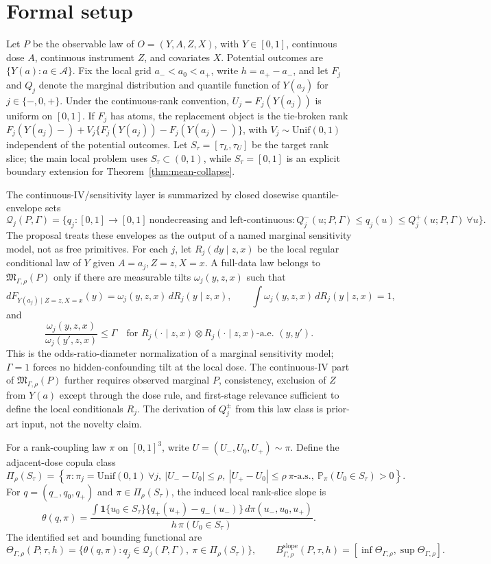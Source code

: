 \documentclass[11pt]{article}
\renewcommand{\Pr}{\mathbb{P}}
\newcommand{\one}{\mathbf{1}}
\theoremstyle{definition}
\theoremstyle{plain}
\theoremstyle{remark}
\begin{document}
\section{Formal setup}
Let \(P\) be the observable law of \(O=(Y,A,Z,X)\), with \(Y\in[0,1]\), continuous dose \(A\), continuous instrument \(Z\), and covariates \(X\).  Potential outcomes are \(\{Y(a):a\in\mathcal A\}\).  Fix the local grid \(a_-<a_0<a_+\), write \(h=a_+-a_-\), and let \(F_j\) and \(Q_j\) denote the marginal distribution and quantile function of \(Y(a_j)\) for \(j\in\{-,0,+\}\).  Under the continuous-rank convention, \(U_j=F_j(Y(a_j))\) is uniform on \([0,1]\).  If \(F_j\) has atoms, the replacement object is the tie-broken rank \(F_j(Y(a_j)-)+V_j\{F_j(Y(a_j))-F_j(Y(a_j)-)\}\), with \(V_j\sim\mathrm{Unif}(0,1)\) independent of the potential outcomes.  Let \(S_\tau=[\tau_L,\tau_U]\) be the target rank slice; the main local problem uses \(S_\tau\subset(0,1)\), while \(S_\tau=[0,1]\) is an explicit boundary extension for Theorem~\ref{thm:mean-collapse}.

The continuous-IV/sensitivity layer is summarized by closed dosewise quantile-envelope sets
\[
\mathcal Q_j(P,\Gamma)=
\{q_j:[0,1]\to[0,1]\ \text{nondecreasing and left-continuous}:
Q^-_j(u;P,\Gamma)\le q_j(u)\le Q^+_j(u;P,\Gamma)\ \forall u\}.
\]
The proposal treats these envelopes as the output of a named marginal sensitivity model, not as free primitives.  For each \(j\), let \(R_j(dy\mid z,x)\) be the local regular conditional law of \(Y\) given \(A=a_j,Z=z,X=x\).  A full-data law belongs to \(\mathfrak M_{\Gamma,\rho}(P)\) only if there are measurable tilts \(\omega_j(y,z,x)\) such that
\[
dF_{Y(a_j)\mid Z=z,X=x}(y)=\omega_j(y,z,x)\,dR_j(y\mid z,x),\qquad
\int\omega_j(y,z,x)\,dR_j(y\mid z,x)=1,
\]
and
\[
\frac{\omega_j(y,z,x)}{\omega_j(y',z,x)}\le\Gamma
\quad\text{for }R_j(\cdot\mid z,x)\otimes R_j(\cdot\mid z,x)\text{-a.e. }(y,y').
\]
This is the odds-ratio-diameter normalization of a marginal sensitivity model; \(\Gamma=1\) forces no hidden-confounding tilt at the local dose.  The continuous-IV part of \(\mathfrak M_{\Gamma,\rho}(P)\) further requires observed marginal \(P\), consistency, exclusion of \(Z\) from \(Y(a)\) except through the dose rule, and first-stage relevance sufficient to define the local conditionals \(R_j\).  The derivation of \(Q_j^\pm\) from this law class is prior-art input, not the novelty claim.

For a rank-coupling law \(\pi\) on \([0,1]^3\), write \(U=(U_-,U_0,U_+)\sim\pi\).  Define the adjacent-dose copula class
\[
\Pi_\rho(S_\tau)=
\left\{\pi:
\pi_j=\mathrm{Unif}(0,1)\ \forall j,\ 
|U_--U_0|\le\rho,\ |U_+-U_0|\le\rho\ \pi\text{-a.s.},\
\Pr_\pi(U_0\in S_\tau)>0
\right\}.
\]
For \(q=(q_-,q_0,q_+)\) and \(\pi\in\Pi_\rho(S_\tau)\), the induced local rank-slice slope is
\[
\theta(q,\pi)
=
\frac{
\int \one\{u_0\in S_\tau\}\{q_+(u_+)-q_-(u_-)\}\,d\pi(u_-,u_0,u_+)
}{
h\,\pi(U_0\in S_\tau)
}.
\]
The identified set and bounding functional are
\[
\Theta_{\Gamma,\rho}(P;\tau,h)
=
\{\theta(q,\pi): q_j\in\mathcal Q_j(P,\Gamma),\ \pi\in\Pi_\rho(S_\tau)\},
\qquad
B_{\Gamma,\rho}^{\mathrm{slope}}(P,\tau,h)
=
[\inf\Theta_{\Gamma,\rho},\sup\Theta_{\Gamma,\rho}].
\]
\end{document}
